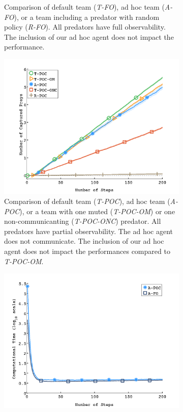 \begin{figure}[t]
\begin{subfigure}[t]{0.245\textwidth}
    \caption{Comparison of default team (\emph{T-FO}), ad hoc team (\emph{A-FO}), or a team including a predator with random policy (\emph{R-FO}). All predators have full observability. The inclusion of our ad hoc agent does not impact the performance.}
    \label{fig:fullobs}
  \end{subfigure}
  \begin{subfigure}[t]{0.245\textwidth}
    \centering
    \captionsetup{width=1.15\textwidth}
    \includegraphics[trim=2.6cm 0.4cm 2.7cm 1.8cm, clip=true,width=\figwidth\textwidth]{plots/with_noise/partialObsCom.png}
    \caption{Comparison of default team (\emph{T-POC}), ad hoc team (\emph{A-POC}), or a team with one muted (\emph{T-POC-OM}) or one non-communicanting (\emph{T-POC-ONC}) predator. All predators have partial observability. The ad hoc agent does not communicate. The inclusion of our ad hoc agent does not impact the performances compared to \emph{T-POC-OM}.}
    \label{fig:partialobscom}
  \end{subfigure}
  \begin{subfigure}[t]{0.245\textwidth}
    \centering
    \captionsetup{width=0.62\textwidth}
    \includegraphics[trim=1.5cm 0.3cm 2.7cm 1.8cm, clip=true,width=\figwidth\textwidth]{plots/with_noise/computationalTime.png}

\end{subfigure}
\end{figure}
